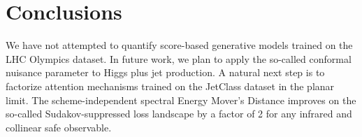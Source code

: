 \section{Conclusions}\label{sec:conclusions}

We have not attempted to quantify score-based generative models trained
on the LHC Olympics dataset. In future work, we plan to apply the
so-called conformal nuisance parameter to Higgs plus jet production. A
natural next step is to factorize attention mechanisms trained on the
JetClass dataset in the planar limit. The scheme-independent spectral
Energy Mover's Distance improves on the so-called Sudakov-suppressed
loss landscape by a factor of 2 for any infrared and collinear safe
observable.

